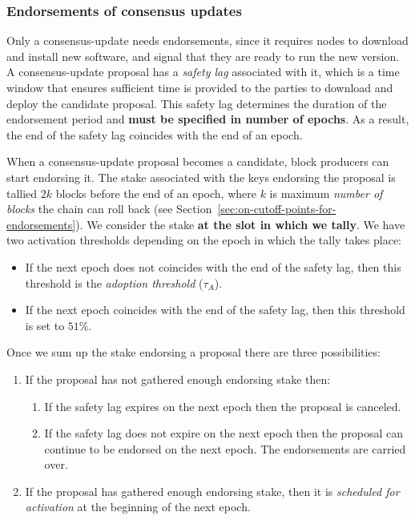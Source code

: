 \subsubsection{Endorsements of consensus updates}
\label{sec:endorsemnts}

Only a consensus-update needs endorsements, since it requires nodes to download
and install new software, and signal that they are ready to run the new version.
A consensus-update proposal has a \emph{safety lag} associated with it, which is
a time window that ensures sufficient time is provided to the parties to
download and deploy the candidate proposal. This safety lag determines the
duration of the endorsement period and \textbf{must be specified in number of
	epochs}. As a result, the end of the safety lag coincides with the end of an
epoch.

When a consensus-update proposal becomes a candidate, block producers can start
endorsing it. The stake associated with the keys endorsing the proposal is
tallied $2k$ blocks before the end of an epoch, where $k$ is maximum
\emph{number of blocks} the chain can roll back (see
Section~\ref{sec:on-cutoff-points-for-endorsements}). We consider the stake
\textbf{at the slot in which we tally}. We have two activation thresholds
depending on the epoch in which the tally takes place:
\begin{itemize}
	\item If the next epoch does not coincides with the end of the safety lag, 
	then
	this threshold is the \emph{adoption threshold} ($\tau_A$).
	\item If the next epoch coincides with the end of the safety lag, then this
	threshold is set to $51\%$.
\end{itemize}

Once we sum up the stake endorsing a proposal there are three possibilities:
\begin{enumerate}
	\item If the proposal has not gathered enough endorsing stake then:
	\begin{enumerate}
		\item If the safety lag expires on the next epoch then the proposal is
		canceled.
		\item If the safety lag does not expire on the next epoch then the 
		proposal
		can continue to be endorsed on the next epoch. The endorsements are 
		carried
		over.
	\end{enumerate}
	\item If the proposal has gathered enough endorsing stake, then it is
	\emph{scheduled for activation} at the beginning of the next epoch.
\end{enumerate}

